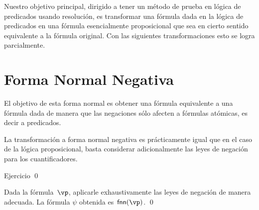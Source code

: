 \documentclass[11pt,letterpaper]{article}
\begin{document}
Nuestro objetivo principal, dirigido a tener un método de prueba en lógica de 
predicados usando resolución, es transformar una f\'ormula dada en la 
lógica de predicados en una f\'ormula esencialmente proposicional que sea en 
cierto sentido equivalente a la f\'ormula original. Con las siguientes 
transformaciones esto se logra parcialmente.

\section{Forma Normal Negativa}

El objetivo de esta forma normal es obtener una f\'ormula equivalente a una
f\'ormula dada de manera que las negaciones sólo afecten a fórmulas atómicas,
es decir a predicados.  



La transformación a forma normal negativa es prácticamente igual que en el
caso de la lógica proposicional, basta considerar adicionalmente las leyes de
negación para los cuantificadores.


\proof Ejercicio
\qed

\proof
Dada la fórmula~$\vp$, aplicarle exhaustivamente las leyes de negaci\'on de
manera adecuada. La f\'ormula $\psi$ obtenida es~$\mathsf{fnn}(\vp)$.  
\qed
\end{document}
